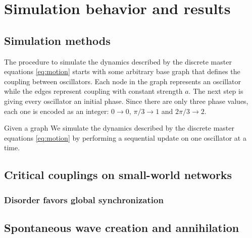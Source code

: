 \chapter{Simulation behavior and results}
\label{chap:simulation}

\section{Simulation methods}

The procedure to simulate the dynamics described by the discrete master equations \ref{eq:motion} starts with some arbitrary base graph
that defines the coupling between oscillators. Each node in the graph represents an oscillator while the edges represent coupling with
constant strength $a$. The next step is giving every oscillator an initial phase. Since there are only three phase values, each one is
encoded as an integer: $0 \rightarrow 0$, $\pi/3 \rightarrow 1$ and $2\pi/3 \rightarrow 2$.

Given a graph
We simulate the dynamics described by the discrete master equations \ref{eq:motion} by performing a sequential update on one oscillator
at a time. 


\section{Critical couplings on small-world networks}

\subsection{Disorder favors global synchronization}

\section{Spontaneous wave creation and annihilation}
